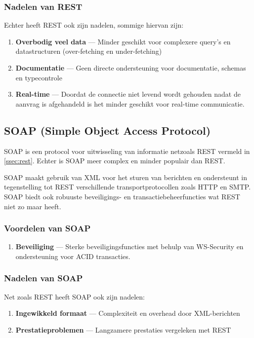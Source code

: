 \subsubsection{Nadelen van REST}
Echter heeft REST ook zijn nadelen, sommige hiervan zijn:
\begin{enumerate}
  \item \textbf{Overbodig veel data} --- Minder geschikt voor complexere query's
   en datastructuren (over-fetching en under-fetching)
  \item \textbf{Documentatie} --- Geen directe ondersteuning voor documentatie,
   schemas en typecontrole
  \item \textbf{Real-time} --- Doordat de connectie niet levend wordt gehouden nadat
   de aanvrag is afgehandeld is het minder geschikt voor real-time communicatie.
\end{enumerate}

\subsection{SOAP (Simple Object Access Protocol)}
SOAP is een protocol voor uitwisseling van informatie netzoals REST vermeld in
\autoref{ssec:rest}. Echter is SOAP meer complex en minder populair dan REST.

SOAP maakt gebruik van XML voor het sturen van berichten en ondersteunt
in tegenstelling tot REST verschillende transportprotocollen zoals
HTTP en SMTP. SOAP biedt ook robuuste beveiligings- en transactiebeheerfuncties
wat REST niet zo maar heeft.\cite{Śliwa_Pańczyk_2021,w3c}

\subsubsection{Voordelen van SOAP}
\begin{enumerate}
    \item \textbf{Beveiliging} --- Sterke beveiligingsfuncties met behulp van
    WS-Security en ondersteuning voor ACID transacties.
\end{enumerate}

\subsubsection{Nadelen van SOAP}
Net zoals REST heeft SOAP ook zijn nadelen:
\begin{enumerate}
    \item \textbf{Ingewikkeld formaat} --- Complexiteit en overhead door XML-berichten
    \item \textbf{Prestatieproblemen} --- Langzamere prestaties vergeleken met REST
\end{enumerate}

